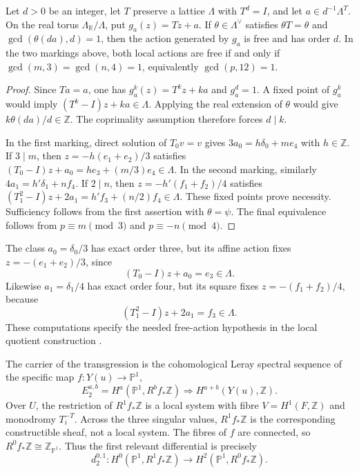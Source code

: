 \documentclass[11pt]{article}
\numberwithin{equation}{section}
\begin{document}
\begin{proposition}\label{prop:affine-free}
Let $d>0$ be an integer, let $T$ preserve a lattice $\Lambda$ with
$T^d=I$, and let
$a\in d^{-1}\Lambda^T$.  On the real torus
$\Lambda_{\mathbb R}/\Lambda$, put $g_a(z)=Tz+a$.
If $\theta\in\Lambda^\vee$ satisfies $\theta T=\theta$ and
$\gcd(\theta(da),d)=1$, then the action generated by $g_a$ is free
and has order $d$.  In the two markings above, both local actions are
free if and only if $\gcd(m,3)=\gcd(n,4)=1$, equivalently
$\gcd(p,12)=1$.
\end{proposition}

\begin{proof}
Since $Ta=a$, one has $g_a^k(z)=T^kz+ka$ and $g_a^d=1$.
A fixed point of $g_a^k$ would imply
$(T^k-I)z+ka\in\Lambda$.  Applying the real extension of $\theta$
would give $k\theta(da)/d\in\mathbb Z$.  The coprimality assumption
therefore forces $d\mid k$.

In the first marking, direct solution of $T_0v=v$ gives
$3a_0=h\delta_0+me_4$ with $h\in\mathbb Z$.
If $3\mid m$, then $z=-h(e_1+e_2)/3$ satisfies
$(T_0-I)z+a_0=he_3+(m/3)e_4\in\Lambda$.
In the second marking, similarly $4a_1=h'\delta_1+nf_4$.
If $2\mid n$, then $z=-h'(f_1+f_2)/4$ satisfies
$(T_1^2-I)z+2a_1=h'f_3+(n/2)f_4\in\Lambda$.
These fixed points prove necessity.  Sufficiency follows from the
first assertion with $\theta=\psi$.  The final equivalence follows
from $p\equiv m\pmod3$ and $p\equiv-n\pmod4$.
\end{proof}

The class $a_0=\delta_0/3$ has exact order three, but its affine action
fixes $z=-(e_1+e_2)/3$, since
\[
             (T_0-I)z+a_0=e_3\in\Lambda.
\]
Likewise $a_1=\delta_1/4$ has exact order four, but its square fixes
$z=-(f_1+f_2)/4$, because
\[
             (T_1^2-I)z+2a_1=f_3\in\Lambda.
\]
These computations specify the needed free-action hypothesis in the local
quotient construction \cite[Section~3.2, pp.~10--11]{Engel}.

The carrier of the transgression is the cohomological Leray spectral
sequence of the specific map $f:Y(u)\to\mathbb P^1$,
\[
 E_2^{a,b}=H^a(\mathbb P^1,R^bf_*\mathbb Z)
       \Longrightarrow H^{a+b}(Y(u),\mathbb Z).                   \tag{5.2}
\]
Over $U$, the restriction of $R^1f_*\mathbb Z$ is a local system with
fibre $V=H^1(F,\mathbb Z)$ and monodromy $T_i^{-T}$.  Across the three
singular values, $R^1f_*\mathbb Z$ is the corresponding constructible
sheaf, not a local system.  The fibres of $f$ are connected, so
$R^0f_*\mathbb Z\cong\mathbb Z_{\mathbb P^1}$.  Thus the first relevant
differential is precisely
\[
 d_2^{0,1}:H^0(\mathbb P^1,R^1f_*\mathbb Z)
       \longrightarrow H^2(\mathbb P^1,R^0f_*\mathbb Z).          \tag{5.3}
\]
\end{document}
